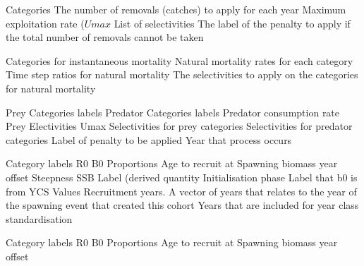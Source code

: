  {Categories}
 {The number of removals (catches) to apply for each year}
 {Maximum exploitation rate ($Umax$}
 {List of selectivities}
 {The label of the penalty to apply if the total number of removals cannot be taken}
\par\textbf{}\par
{} {Categories for instantaneous mortality}
 {Natural mortality rates for each category}
 {Time step ratios for natural mortality}
 {The selectivities to apply on the categories for natural mortality}
\par\textbf{}\par
{} {Prey Categories labels}
 {Predator Categories labels}
 {Predator consumption rate}
 {Prey Electivities}
 {Umax}
 {Selectivities for prey categories}
 {Selectivities for predator categories}
 {Label of penalty to be applied}
 {Year that process occurs}
\par\textbf{}\par
\par\textbf{}\par
{} {Category labels}
 {R0}
 {B0}
 {Proportions}
 {Age to recruit at}
 {Spawning biomass year offset}
 {Steepness}
 {SSB Label (derived quantity}
 {Initialisation phase Label that b0 is from}
 {YCS Values}
 {Recruitment years. A vector of years that relates to the year of the spawning event that created this cohort}
 {Years that are included for year class standardisation}
\par\textbf{}\par
{} {Category labels}
 {R0}
 {B0}
 {Proportions}
 {Age to recruit at}
 {Spawning biomass year offset}
